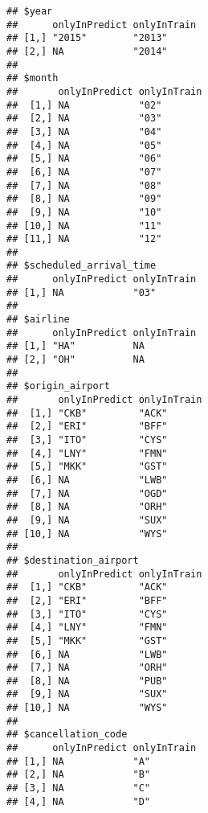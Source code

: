 \documentclass{article}\usepackage[]{graphicx}\usepackage[]{color}
\makeatletter
\newenvironment{kframe}{%
 \def\at@end@of@kframe{}%
 \ifinner\ifhmode%
  \def\at@end@of@kframe{\end{minipage}}%
  \begin{minipage}{\columnwidth}%
 \fi\fi%
 \def\FrameCommand##1{\hskip\@totalleftmargin \hskip-\fboxsep
 \colorbox{shadecolor}{##1}\hskip-\fboxsep
     \hskip-\linewidth \hskip-\@totalleftmargin \hskip\columnwidth}%
 \MakeFramed {\advance\hsize-\width
   \@totalleftmargin\z@ \linewidth\hsize
   \@setminipage}}%
 {\par\unskip\endMakeFramed%
 \at@end@of@kframe}
\newenvironment{knitrout}{}{} %
\makeatother
\begin{document}
\begin{knitrout}
\color{fgcolor}\begin{kframe}
\begin{verbatim}
## $year
##      onlyInPredict onlyInTrain
## [1,] "2015"        "2013"     
## [2,] NA            "2014"     
## 
## $month
##       onlyInPredict onlyInTrain
##  [1,] NA            "02"       
##  [2,] NA            "03"       
##  [3,] NA            "04"       
##  [4,] NA            "05"       
##  [5,] NA            "06"       
##  [6,] NA            "07"       
##  [7,] NA            "08"       
##  [8,] NA            "09"       
##  [9,] NA            "10"       
## [10,] NA            "11"       
## [11,] NA            "12"       
## 
## $scheduled_arrival_time
##      onlyInPredict onlyInTrain
## [1,] NA            "03"       
## 
## $airline
##      onlyInPredict onlyInTrain
## [1,] "HA"          NA         
## [2,] "OH"          NA         
## 
## $origin_airport
##       onlyInPredict onlyInTrain
##  [1,] "CKB"         "ACK"      
##  [2,] "ERI"         "BFF"      
##  [3,] "ITO"         "CYS"      
##  [4,] "LNY"         "FMN"      
##  [5,] "MKK"         "GST"      
##  [6,] NA            "LWB"      
##  [7,] NA            "OGD"      
##  [8,] NA            "ORH"      
##  [9,] NA            "SUX"      
## [10,] NA            "WYS"      
## 
## $destination_airport
##       onlyInPredict onlyInTrain
##  [1,] "CKB"         "ACK"      
##  [2,] "ERI"         "BFF"      
##  [3,] "ITO"         "CYS"      
##  [4,] "LNY"         "FMN"      
##  [5,] "MKK"         "GST"      
##  [6,] NA            "LWB"      
##  [7,] NA            "ORH"      
##  [8,] NA            "PUB"      
##  [9,] NA            "SUX"      
## [10,] NA            "WYS"      
## 
## $cancellation_code
##      onlyInPredict onlyInTrain
## [1,] NA            "A"        
## [2,] NA            "B"        
## [3,] NA            "C"        
## [4,] NA            "D"
\end{verbatim}
\end{kframe}
\end{knitrout}

\pagebreak
\end{document}
